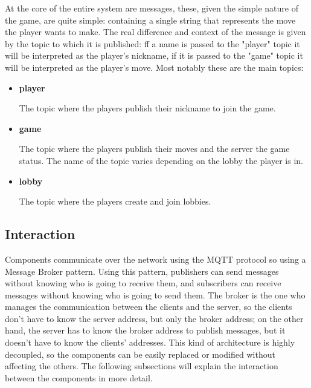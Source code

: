 \documentclass{scrartcl}
\begin{document}
At the core of the entire system are messages, these, given the simple nature of the game, are quite
simple: containing a single string that represents the move the player wants to make. \newline
The real difference and context of the message is given by the topic to which it is published:
ff a name is passed to the "player" topic it will be interpreted as the player's nickname,
if it is passed to the "game" topic it will be interpreted as the player's move. \newline
Most notably these are the main topics:
\begin{itemize}
    \item \textbf{player} \par
          The topic where the players publish their nickname to join the game.
    \item \textbf{game} \par
          The topic where the players publish their moves and the server the game status. \newline
          The name of the topic varies depending on the lobby the player is in.
    \item \textbf{lobby} \par
          The topic where the players create and join lobbies.
\end{itemize}

\subsection{Interaction}\label{interaction}

Components communicate over the network using the MQTT protocol so using a Message Broker pattern. Using this pattern, publishers can send messages without knowing who is going to receive them, and subscribers can receive messages without knowing who is going to send them.
The broker is the one who manages the communication between the clients and the server, so the clients don't have to know the server address, but only the broker address; on the other hand, the server has to know the broker address to publish messages, but it doesn't have to know the clients' addresses. \newline
This kind of architecture is highly decoupled, so the components can be easily replaced or modified without affecting the others. \newline
The following subsections will explain the interaction between the components in more detail.
\end{document}
